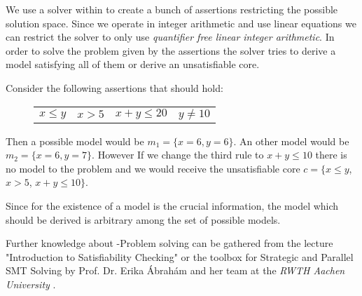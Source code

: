 We use a solver within \aprove to create a bunch of assertions restricting the possible solution space. Since we operate in integer arithmetic and use linear equations we can restrict the solver to only use \textit{quantifier free linear integer arithmetic}. In order to solve the problem given by the assertions the solver tries to derive a model satisfying all of them or derive an unsatisfiable core. \cite{sat2016}\newline

\begin{example}
	Consider the following assertions that should hold:\newline
	\vspace{-1em}
	\begin{figure}[H]
		\centering
		\begin{tabular}{cccc}
			$x \le y$ &	$x > 5 $ &	$ x+ y \le 20$ &$y \neq 10$ \\
		\end{tabular}
	\end{figure}
	\vspace{-1em}
	Then a possible model would be $m_1 = \{x=6, y=6\}$. An other model would be $m_2 = \{x=6, y=7\}$.
	However If we change the third rule to $x+y\le 10$ there is no model to the problem and we would receive the unsatisfiable core $c= \{x \le y$, $x > 5$, $x+ y \le 10 \}$.
\end{example}

Since for  the existence of a model is the crucial information, the model which should be derived is arbitrary among the set of possible models.

Further knowledge about -Problem solving can be gathered from the lecture "Introduction to Satisfiability Checking" or the  toolbox for Strategic and Parallel SMT Solving by Prof. Dr. Erika Ábrahám and her team at the \textit{RWTH Aachen University} \cite{corzilius2015smt}.
